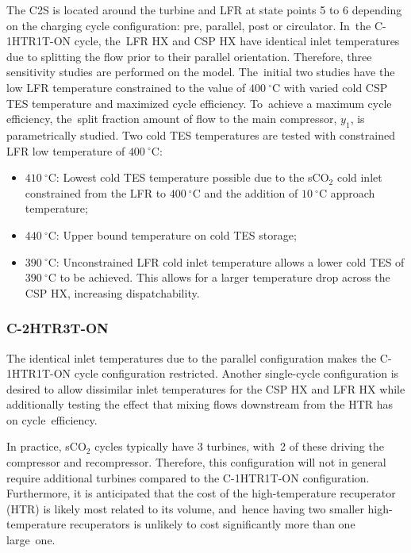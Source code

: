 \documentclass[sustainability,article,accept,moreauthors,pdftex]{Definitions/mdpi}
\begin{document}
\begin{paracol}{2}
\switchcolumn

The C2S is located around the turbine and LFR at state points 5 to 6 depending on the charging cycle configuration: pre, parallel, post or circulator. In~the C-1HTR1T-ON cycle, the~LFR HX and CSP HX have identical inlet temperatures due to splitting the flow prior to their parallel orientation. Therefore, three sensitivity studies are performed on the model. The~initial two studies have the low LFR temperature constrained to the value of $400~^{\circ}$C with varied cold CSP TES temperature and maximized cycle efficiency. To~achieve a maximum cycle efficiency, the~split fraction amount of flow to the main compressor, $y_{1}$, is parametrically studied.
Two cold TES temperatures are tested with constrained LFR low temperature of $400~^{\circ}$C: 
\begin{itemize}
    \item	$410~^{\circ}$C: Lowest cold TES temperature possible due to the sCO$_2$ cold inlet constrained from the LFR to $400~^{\circ}$C and the addition of $10~^{\circ}$C approach temperature;
    \item	$440~^{\circ}$C: Upper bound temperature on cold TES storage;
    \item	$390~^{\circ}$C: Unconstrained LFR cold inlet temperature allows a lower cold TES of $390~^{\circ}$C to be achieved. This allows for a larger temperature drop across the CSP HX, increasing dispatchability.
\end{itemize}


\subsubsection{C-2HTR3T-ON} 

The identical inlet temperatures due to the parallel configuration makes the C-1HTR1T-ON cycle configuration restricted. Another single-cycle configuration is desired to allow dissimilar inlet temperatures for the CSP HX and LFR HX while additionally testing the effect that mixing flows downstream from the HTR has on cycle~efficiency. 

In practice, sCO$_2$ cycles typically have 3 turbines, with~2 of these driving the compressor and recompressor. Therefore, this configuration will not in general require additional turbines compared to the C-1HTR1T-ON configuration. Furthermore, it is anticipated that the cost of the high-temperature recuperator (HTR) is likely most related to its volume, and~hence having two smaller high-temperature recuperators is unlikely to cost significantly more than one large~one. 


\end{paracol}
\end{document}
